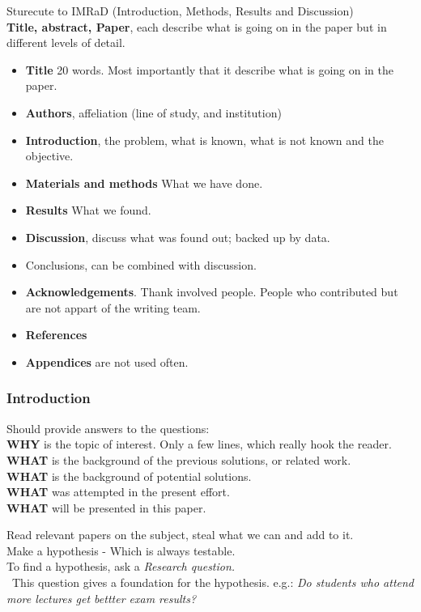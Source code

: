 \documentclass[a4paper]{article}
\begin{document}
Sturecute to IMRaD (Introduction, Methods, Results and Discussion)\\
\textbf{Title, abstract, Paper}, each describe what is going on in the paper but in different levels of detail. 
\begin{itemize}
	\item \textbf{Title} 20 words. Most importantly that it describe what is going on in the paper.  
	\item \textbf{Authors}, affeliation (line of study, and institution)
	\item \textbf{Introduction}, the problem, what is known, what is not known and the objective.
	\item \textbf{Materials and methods} What we have done.
	\item \textbf{Results} What we found. 
	\item \textbf{Discussion}, discuss what was found out; backed up by data.
	\item Conclusions, can be combined with discussion.
	\item \textbf{Acknowledgements}. Thank involved people. People who contributed but are not appart of the writing team. 
	\item \textbf{References}  
	\item \textbf{Appendices} are not used often. 
\end{itemize}


\subsubsection{Introduction}
Should provide answers to the questions: \\
\textbf{WHY} is the topic of interest. Only a few lines, which really hook the reader. \\
\textbf{WHAT} is the background of the previous solutions, or related work. \\
\textbf{WHAT} is the background of potential solutions. \\
\textbf{WHAT} was attempted in the present effort. \\
\textbf{WHAT} will be presented in this paper. 

Read relevant papers on the subject, steal what we can and add to it. \\
Make a hypothesis - Which is always testable. \\
To find a hypothesis, ask a \textit{Research question.} \\\
This question gives a foundation for the hypothesis. e.g.: \textit{Do students who attend more lectures get bettter exam results?} 
\end{document}

